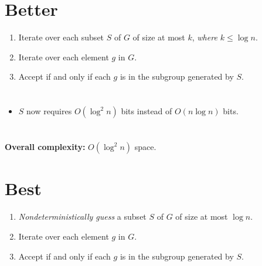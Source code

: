 \documentclass{lposter-with-tkz-graph} %
\newenvironment{poster}{%
\thispagestyle{fancy}
\begin{multicols*}{3}
}%
{\end{multicols*}
}
\begin{document}
\begin{poster}
\columnbreak


\section{Better}

\begin{enumerate}
\item Iterate over each subset $S$ of $G$ of size at most $k$, \emph{where $k \leq \log n$}.
\item Iterate over each element $g$ in $G$.
\item Accept if and only if each $g$ is in the subgroup generated by $S$.
\end{enumerate}

\section{}

\begin{itemize}
\itemsep1em
\item[] $S$ now requires $O(\log^2 n)$ bits instead of $O(n \log n)$ bits.
\end{itemize}

\section{}

\begin{center}
  \textbf{Overall complexity:} $O(\log^2 n)$ space.
\end{center}

\columnbreak


\section{Best}

\begin{enumerate}
\item \emph{Nondeterministically guess} a subset $S$ of $G$ of size at most $\log n$.
\item Iterate over each element $g$ in $G$.
\item Accept if and only if each $g$ is in the subgroup generated by $S$.
\end{enumerate}

\section{}


\end{poster}
\end{document}
